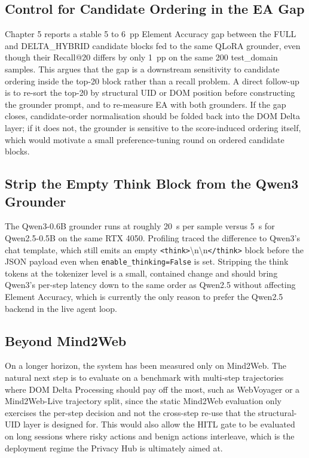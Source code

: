 \subsection{Control for Candidate Ordering in the EA Gap}
Chapter 5 reports a stable 5 to 6~pp Element Accuracy gap between the FULL and DELTA\_HYBRID candidate blocks fed to the same QLoRA grounder, even though their Recall@20 differs by only 1~pp on the same 200 test\_domain samples. This argues that the gap is a downstream sensitivity to candidate ordering inside the top-20 block rather than a recall problem. A direct follow-up is to re-sort the top-20 by structural UID or DOM position before constructing the grounder prompt, and to re-measure EA with both grounders. If the gap closes, candidate-order normalisation should be folded back into the DOM Delta layer; if it does not, the grounder is sensitive to the score-induced ordering itself, which would motivate a small preference-tuning round on ordered candidate blocks.

\subsection{Strip the Empty Think Block from the Qwen3 Grounder}
The Qwen3-0.6B grounder runs at roughly 20~s per sample versus 5~s for Qwen2.5-0.5B on the same RTX 4050. Profiling traced the difference to Qwen3's chat template, which still emits an empty \texttt{<think>}\textbackslash n\textbackslash n\texttt{</think>} block before the JSON payload even when \texttt{enable\_thinking=False} is set. Stripping the think tokens at the tokenizer level is a small, contained change and should bring Qwen3's per-step latency down to the same order as Qwen2.5 without affecting Element Accuracy, which is currently the only reason to prefer the Qwen2.5 backend in the live agent loop.

\subsection{Beyond Mind2Web}
On a longer horizon, the system has been measured only on Mind2Web. The natural next step is to evaluate on a benchmark with multi-step trajectories where DOM Delta Processing should pay off the most, such as WebVoyager or a Mind2Web-Live trajectory split, since the static Mind2Web evaluation only exercises the per-step decision and not the cross-step re-use that the structural-UID layer is designed for. This would also allow the HITL gate to be evaluated on long sessions where risky actions and benign actions interleave, which is the deployment regime the Privacy Hub is ultimately aimed at.

